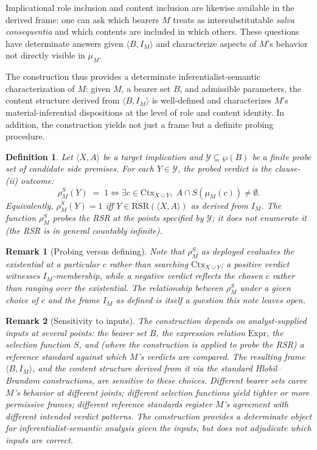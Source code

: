 \documentclass[11pt]{article}
\newtheorem{definition}{Definition}
\newtheorem{remark}{Remark}
\begin{document}
Implicational role inclusion and content inclusion \cite[Def.~90, 93]{hlobil2025} are likewise available in the derived frame: one can ask which bearers $M$ treats as intersubstitutable \emph{salva consequentia} and which contents are included in which others. These questions have determinate answers given $\langle B, I_M \rangle$ and characterize aspects of $M$'s behavior not directly visible in $\mu_M$.

The construction thus provides a determinate inferentialist-semantic characterization of $M$: given $M$, a bearer set $B$, and admissible parameters, the content structure derived from $\langle B, I_M \rangle$ is well-defined and characterizes $M$'s material-inferential dispositions at the level of role and content identity. In addition, the construction yields not just a frame but a definite probing procedure. 

\begin{definition}
Let $\langle X, A \rangle$ be a target implication and $\mathcal{Y} \subseteq \wp(B)$ be a finite \emph{probe set} of candidate side premises. For each $Y \in \mathcal{Y}$, the \emph{probed verdict} is the clause-(ii) outcome:
\[
\rho_M^S(Y) \;=\; 1 \iff \exists c \in \mathrm{Ctx}_{X \cup Y}, \; A \cap S(\mu_M(c)) \neq \emptyset.
\]
Equivalently, $\rho_M^S(Y) = 1$ iff $Y \in \mathrm{RSR}(\langle X, A \rangle)$ as derived from $I_M$. The function $\rho_M^S$ probes the RSR at the points specified by $\mathcal{Y}$; it does not enumerate it (the RSR is in general countably infinite). 
\end{definition}

\begin{remark}[Probing versus defining]
Note that $\rho^S_M$ as deployed evaluates the existential at a particular $c$ rather than searching $\mathrm{Ctx}_{X \cup Y}$; a positive verdict witnesses $I_M$-membership, while a negative verdict reflects the chosen $c$ rather than ranging over the existential. The relationship between $\rho^S_M$ under a given choice of $c$ and the frame $I_M$ as defined is itself a question this note leaves open. 
\end{remark}

\begin{remark}[Sensitivity to inputs]
The construction depends on analyst-supplied inputs at several points: the bearer set $B$, the expression relation $\mathrm{Expr}$, the selection function $S$, and (where the construction is applied to probe the RSR) a reference standard against which $M$'s verdicts are compared. The resulting frame $\langle B, I_M \rangle$, and the content structure derived from it via the standard Hlobil--Brandom constructions, are sensitive to these choices. Different bearer sets carve $M$'s behavior at different joints; different selection functions yield tighter or more permissive frames; different reference standards register $M$'s agreement with different intended verdict patterns. The construction provides a determinate object for inferentialist-semantic analysis given the inputs, but does not adjudicate which inputs are correct.
\end{remark}
\end{document}
